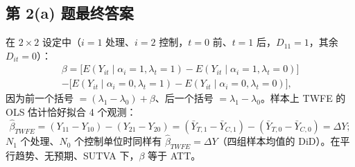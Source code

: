 \subsection{第 2(a) 题最终答案}\label{sec:U17b-2a-ans}

\begin{thm}[第 2(a) 题答案]\label{thm:U17b-2a}
在 $2\times2$ 设定中（$i=1$ 处理、$i=2$ 控制，$t=0$ 前、$t=1$ 后，$D_{11}=1$，其余 $D_{it}=0$）：
\begin{multline*}
\beta=\bigl[E(Y_{it}\mid\alpha_i=1,\lambda_t=1)-E(Y_{it}\mid\alpha_i=1,\lambda_t=0)\bigr]\\
-\bigl[E(Y_{it}\mid\alpha_i=0,\lambda_t=1)-E(Y_{it}\mid\alpha_i=0,\lambda_t=0)\bigr],
\end{multline*}
因为前一个括号 $=(\lambda_1-\lambda_0)+\beta$、后一个括号 $=\lambda_1-\lambda_0$。样本上 TWFE 的 OLS 估计恰好拟合 4 个观测：
\[
\hat\beta_{TWFE}=(Y_{11}-Y_{10})-(Y_{21}-Y_{20})=(\bar Y_{T,1}-\bar Y_{C,1})-(\bar Y_{T,0}-\bar Y_{C,0})=\Delta Y;
\]
$N_1$ 个处理、$N_0$ 个控制单位时同样有 $\hat\beta_{TWFE}=\Delta Y$（四组样本均值的 DiD）。在平行趋势、无预期、SUTVA 下，$\beta$ 等于 ATT。
\end{thm}


